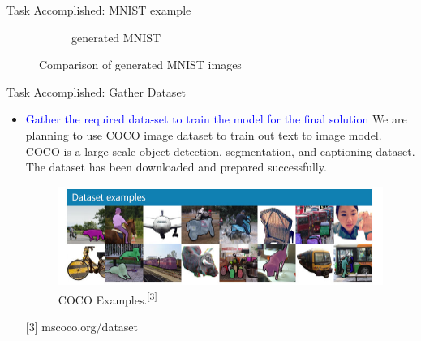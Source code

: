 \documentclass[10pt, a4paper]{beamer}
\begin{document}
\begin{frame}{Task Accomplished: MNIST example}
\begin{itemize}
\begin{figure}[h!]
\begin{subfigure}[b]{0.407\linewidth}
    \caption{generated MNIST}
  \end{subfigure}
  \caption{Comparison of generated MNIST images}
  \label{fig:MNIST}
\end{figure}


	\end{itemize}
\end{frame}





\begin{frame}{Task Accomplished: Gather Dataset}
	\begin{itemize}
	\item
{\textcolor{blue}{Gather the required data-set to train the model for the final solution}
\linebreak \linebreak
We are planning to use COCO image dataset to train out text to image model. COCO is a large-scale object detection, segmentation, and captioning dataset. The dataset has been downloaded and prepared successfully.}

\begin{figure}
  \includegraphics[width=\linewidth]{coco.jpg}
  \caption{COCO Examples.\textsuperscript{[3]}}
  \label{fig:architecture}
\end{figure}
\linebreak
{\scriptsize{[3] mscoco.org/dataset}}
	\end{itemize}
\end{frame}
\end{document}
